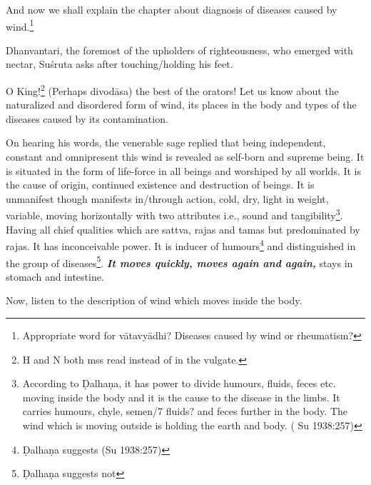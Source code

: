 \begin{translation}

\item [1] And now we shall explain the chapter about diagnosis of
diseases caused by wind.\footnote{ Appropriate word for vātavyādhi?
Diseases caused by wind or rheumatism?}

\item[2]

\item[3] Dhanvantari, the foremost of the upholders of righteousness, who
emerged with nectar, Suśruta asks after touching/holding his
feet.

\item[4] O King!\footnote{ H and N both mss read instead of
 in the vulgate.} (Perhaps divodāsa) the best of the orators! Let us know about
the naturalized and disordered form of wind, its places in the body and
types of the diseases caused by its contamination.

\item[5--9ab] On hearing his words, the venerable sage replied that being
independent, constant and omnipresent this wind is revealed as self-born
and supreme being. It is situated in the form of life-force in all beings
and worshiped by all worlds. It is the cause of origin, continued
existence and destruction of beings. It is unmanifest though manifests
in/through action, cold, dry, light in weight, variable, moving
horizontally with two attributes i.e., sound and
tangibility\footnote{According to Ḍalhaṇa, it has power to divide
humours, fluids, feces etc. moving inside the body and it is the cause to
the disease in the limbs. It carries humours, chyle, semen/7 fluids? and
feces further in the body. The wind which is moving outside is holding
the earth and body. (  Su 1938:257)}. Having all
chief qualities which are sattva, rajas and tamas but predominated by
rajas. It has inconceivable power. It is inducer of humours\footnote{
Ḍalhaṇa suggests  (Su 1938:257)} and distinguished in
the group of diseases\footnote{ Ḍalhaṇa suggests  not 
}. \emph{\textbf{It move}\textbf{s quickly, moves again and
again, }}stays in stomach and intestine.

\item[9cd] Now, listen to the description of wind which moves inside the
body.


\end{translation}
